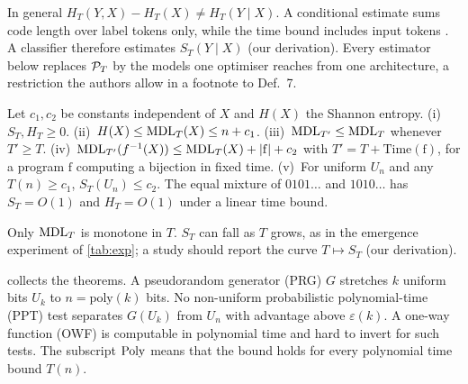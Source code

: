 \documentclass[11pt]{article}
\theoremstyle{tight}
\begin{document}
In general $H_T(Y,X)-H_T(X)\neq H_T(Y\mid X)$. A conditional estimate sums code length over label
tokens only, while the time bound includes input tokens \citep[App.~B.1]{finzi2026epiplexity}. A
classifier therefore estimates $S_T(Y\mid X)$ (our derivation). Every estimator below replaces $\mathcal{P}_T$
by the models one optimiser reaches from one architecture, a restriction the authors allow in a
footnote to Def.~7.

\begin{proposition}\label{prop:basic}
Let $c_1,c_2$ be constants independent of $X$ and $H(X)$ the Shannon entropy.
(i)~$S_T,H_T\ge0$.
(ii)~$H(X)\le\mathrm{MDL}_T(X)\le n+c_1$.
(iii)~$\mathrm{MDL}_{T'}\le\mathrm{MDL}_T$ whenever $T'\ge T$.
(iv)~$\mathrm{MDL}_{T'}(f^{-1}(X))\le\mathrm{MDL}_T(X)+|\mathrm f|+c_2$ with $T'=T+\mathrm{Time}(\mathrm f)$, for a
program $\mathrm f$ computing a bijection in fixed time.
(v)~For uniform $U_n$ and any $T(n)\ge c_1$, $S_T(U_n)\le c_2$. The equal mixture of $0101\ldots$
and $1010\ldots$ has $S_T=O(1)$ and $H_T=O(1)$ under a linear time bound.
\end{proposition}

Only $\mathrm{MDL}_T$ is monotone in $T$. $S_T$ can fall as $T$ grows, as in the emergence experiment of
\cref{tab:exp}; a study should report the curve $T\mapsto S_T$ (our derivation).

 collects the theorems. A pseudorandom generator (PRG) $G$ stretches $k$ uniform bits
$U_k$ to $n=\mathrm{poly}(k)$ bits. No non-uniform probabilistic polynomial-time (PPT) test separates
$G(U_k)$ from $U_n$ with advantage above $\varepsilon(k)$. A one-way function (OWF) is computable in
polynomial time and hard to invert for such tests. The subscript $\mathrm{Poly}$ means that the bound holds
for every polynomial time bound $T(n)$.
\end{document}

